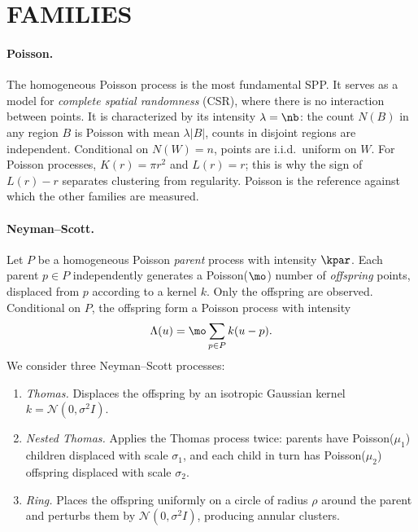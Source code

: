 \appendix
\onecolumn
{}

\section{FAMILIES}
\label{app:families}

\paragraph{Poisson.}
The homogeneous Poisson process is the most fundamental SPP. It serves as a model for \emph{complete spatial
randomness} (CSR), where there is no interaction between points. It is characterized by its intensity $\lambda=\nb$:
the count $N(B)$ in any region $B$ is Poisson with mean $\lambda|B|$, counts in disjoint regions are independent.
Conditional on $N(W)=n$, points are i.i.d.\ uniform on $W$. For Poisson processes, $K(r)=\pi r^2$ and $L(r)=r$; this is why the sign of $L(r)-r$ separates clustering from regularity. Poisson is the reference against which the other families are measured.

\paragraph{Neyman--Scott.}
Let $P$ be a homogeneous Poisson \emph{parent} process with intensity $\kpar$. Each parent $p\in P$ independently
generates a Poisson($\mo$) number of \emph{offspring} points, displaced from $p$ according to a kernel $k$. Only the
offspring are observed. Conditional on $P$, the offspring form a Poisson process with intensity
\[
  \Lambda(u) = \mo \sum_{p \in P} k(u - p).
\]
We consider three Neyman--Scott processes:
\begin{enumerate}
    \item \emph{Thomas.} Displaces the offspring by an isotropic Gaussian kernel $k=\mathcal N(0,\sigma^2 I)$.
    \item \emph{Nested Thomas.} Applies the Thomas process twice: parents have Poisson($\mu_1$) children displaced with scale $\sigma_1$, and each child in turn has Poisson($\mu_2$) offspring displaced with scale $\sigma_2$.
    \item \emph{Ring.} Places the offspring uniformly on a circle of radius $\rho$ around the parent and perturbs them by $\mathcal N(0,\sigma^2 I)$, producing annular clusters.
\end{enumerate}


